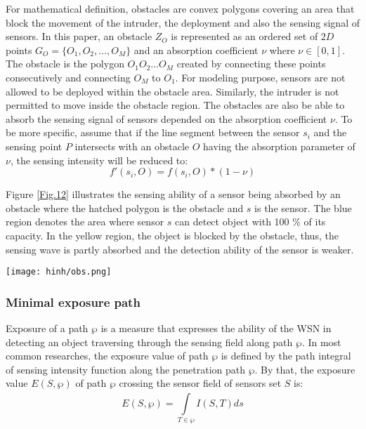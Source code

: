 \documentclass[final]{elsarticle}
\begin{document}
For mathematical definition, obstacles are convex polygons covering an area that block the movement of the intruder, the deployment and also the sensing signal of sensors. In this paper, an obstacle $Z_O$ is represented as an ordered set of $2D$ points $ G_O = \{O_1, O_2,\ldots,O_M\}$ and an absorption coefficient $\nu$ where $\nu \in [0,1]$. The obstacle is the polygon $O_1 O_2\ldots O_M $ created by connecting these points consecutively and connecting $O_M$ to $O_1$. For modeling purpose, sensors are not allowed to be deployed within the obstacle area. Similarly, the intruder is not permitted to move inside the obstacle region. The obstacles are also be able to absorb the sensing signal of sensors depended on the absorption coefficient $\nu$. To be more specific, assume that if the line segment between the sensor $s_i$ and the sensing point $ P $ intersects with an obstacle $O$ having the absorption parameter of $\nu$, the sensing intensity will be reduced to: 
\begin{equation}
\label{eq5}
f'(s_i,O) = f(s_i,O) * (1-\nu) 
\end{equation}

Figure \ref{Fig.12} illustrates the sensing ability of a sensor being absorbed by an obstacle where the hatched polygon is the obstacle and $ s $  is the sensor. The blue region denotes the area where sensor $ s $ can detect object with 100 \% of its capacity. In the yellow region, the object is blocked by the obstacle, thus, the sensing wave is partly absorbed and the detection ability of the sensor is weaker.
\begin{figure*}[h]
	\centering
	\texttt{[image: hinh/obs.png]}
	\caption{Sensing ability of a sensor being absorbed by an obstacle}
	\label{Fig.12}       %
\end{figure*}
\subsubsection{Minimal exposure path}
Exposure of a path $ \wp $ is a measure that expresses the ability of the WSN in detecting an object traversing through the sensing field along path $ \wp $. In most common researches, the exposure value of path $ \wp $ is defined by the path integral of sensing intensity function along the penetration path $ \wp $. By that, the exposure value $  E(S,\wp ) $ of path $ \wp $ crossing the sensor field of sensors set $ S $ is:
\begin{equation}
\label{eq6}
E(S,\wp ) = \int\limits_{T \in \wp }^{} {I(S, T)} ds
\end{equation}
\end{document}
